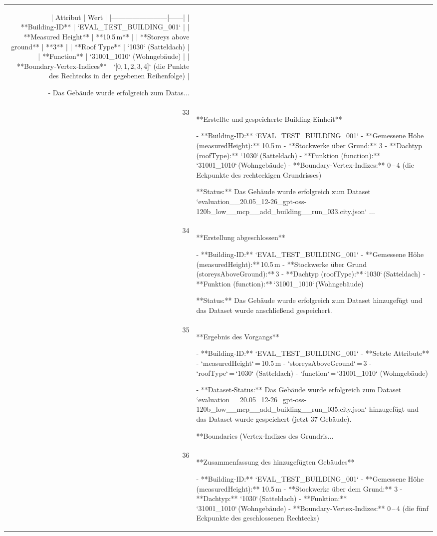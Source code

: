 \documentclass[a4paper,11pt]{article}
\begin{document}
\begin{table}[ht]
\begin{tabular}{r p{12cm}}
| Attribut                | Wert |
|------------------------|------|
| **Building‑ID**        | `EVAL\_TEST\_BUILDING\_001` |
| **Measured Height**    | **10.5 m** |
| **Storeys above ground** | **3** |
| **Roof Type**          | `1030` (Satteldach) |
| **Function**           | `31001\_1010` (Wohngebäude) |
| **Boundary‑Vertex‑Indices** | `[0, 1, 2, 3, 4]` (die Punkte des Rechtecks in der gegebenen Reihenfolge) |

- Das Gebäude wurde erfolgreich zum Datas... \\
33 & **Erstellte und gespeicherte Building‑Einheit**

- **Building‑ID:** `EVAL\_TEST\_BUILDING\_001`  
- **Gemessene Höhe (measuredHeight):** 10.5 m  
- **Stockwerke über Grund:** 3  
- **Dachtyp (roofType):** `1030` (Satteldach)  
- **Funktion (function):** `31001\_1010` (Wohngebäude)  
- **Boundary‑Vertex‑Indizes:** 0 – 4 (die Eckpunkte des rechteckigen Grundrisses)  

**Status:** Das Gebäude wurde erfolgreich zum Dataset `evaluation\_\_20.05\_12-26\_gpt-oss-120b\_low\_\_mcp\_\_add\_building\_\_run\_033.city.json` ... \\
34 & **Erstellung abgeschlossen**

- **Building‑ID:** `EVAL\_TEST\_BUILDING\_001`  
- **Gemessene Höhe (measuredHeight):** 10.5 m  
- **Stockwerke über Grund (storeysAboveGround):** 3  
- **Dachtyp (roofType):** `1030` (Satteldach)  
- **Funktion (function):** `31001\_1010` (Wohngebäude)  

**Status:** Das Gebäude wurde erfolgreich zum Dataset hinzugefügt und das Dataset wurde anschließend gespeichert. \\
35 & **Ergebnis des Vorgangs**

- **Building‑ID:** `EVAL\_TEST\_BUILDING\_001`  
- **Setzte Attribute**  
  - `measuredHeight` = 10.5 m  
  - `storeysAboveGround` = 3  
  - `roofType` = `1030` (Satteldach)  
  - `function` = `31001\_1010` (Wohngebäude)  

- **Dataset‑Status:** Das Gebäude wurde erfolgreich zum Dataset `evaluation\_\_20.05\_12-26\_gpt-oss-120b\_low\_\_mcp\_\_add\_building\_\_run\_035.city.json` hinzugefügt und das Dataset wurde gespeichert (jetzt 37 Gebäude).

**Boundaries (Vertex‑Indizes des Grundris... \\
36 & **Zusammenfassung des hinzugefügten Gebäudes**

- **Building-ID:** `EVAL\_TEST\_BUILDING\_001`  
- **Gemessene Höhe (measuredHeight):** 10.5 m  
- **Stockwerke über dem Grund:** 3  
- **Dachtyp:** `1030` (Satteldach)  
- **Funktion:** `31001\_1010` (Wohngebäude)  
- **Boundary‑Vertex‑Indizes:** 0 – 4 (die fünf Eckpunkte des geschlossenen Rechtecks)  


\end{tabular}
\end{table}
\end{document}
